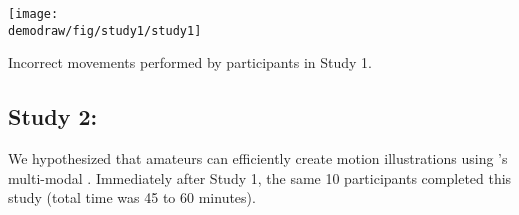 
\begin{table}
  \centering
  \texttt{[image: \\demodraw/fig/study1/study1]}
  \caption{Incorrect movements performed by participants in Study 1.}
  \label{tab:study1_errors}
\end{table}


\subsection{Study 2: \phaseI{}}

We hypothesized that amateurs can efficiently create motion illustrations using \systemname{}'s multi-modal \phaseI{}.
%
Immediately after Study 1, the same 10 participants completed this study (total time was 45 to 60 minutes).

